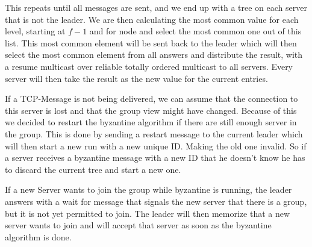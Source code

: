 \documentclass[runningheads]{llncs}
\begin{document}
This repeats until all messages are sent, and we end up with a tree on each
server that is not the leader. We are then calculating the most common value
for each level, starting at $f - 1$ and for node and select the most common one
out of this list. This most common element will be sent back to the leader
which will then select the most common element from all answers and distribute
the result, with a resume multicast over reliable totally ordered multicast to
all servers. Every server will then take the result as the new value for the
current entries.

If a TCP-Message is not being delivered, we can assume that the connection to
this server is lost and that the group view might have changed. Because of this
we decided to restart the byzantine algorithm if there are still enough server
in the group. This is done by sending a restart message to the current leader
which will then start a new run with a new unique ID. Making the old one
invalid. So if a server receives a byzantine message with a new ID that he
doesn't know he has to discard the current tree and start a new one.

If a new Server wants to join the group while byzantine is running, the leader
answers with a wait for message that signals the new server that there is a
group, but it is not yet permitted to join. The leader will then memorize that
a new server wants to join and will accept that server as soon as the byzantine
algorithm is done.
\end{document}

